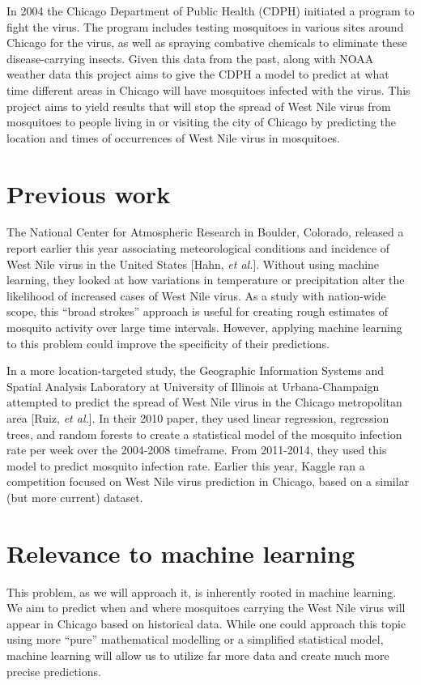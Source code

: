 \documentclass{article} %
\begin{document}
In 2004 the Chicago Department of Public Health (CDPH) initiated a program to fight the virus.  The program includes testing mosquitoes in various sites around Chicago for the virus, as well as spraying combative chemicals to eliminate these disease-carrying insects.  Given this data from the past, along with NOAA weather data this project aims to give the CDPH a model to predict at what time different areas in Chicago will have mosquitoes infected with the virus. This project aims to yield results that will stop the spread of West Nile virus from mosquitoes to people living in or visiting the city of Chicago by predicting the location and times of occurrences of West Nile virus in mosquitoes.

\section{Previous work}
The National Center for Atmospheric Research in Boulder, Colorado, released a report earlier this year associating meteorological conditions and incidence of West Nile virus in the United States [Hahn, \textit{et al.}].  Without using machine learning, they looked at how variations in temperature or precipitation alter the likelihood of increased cases of West Nile virus.    As a study with nation-wide scope, this ``broad strokes'' approach is useful for creating rough estimates of mosquito activity over large time intervals.  However, applying machine learning to this problem could improve the specificity of their predictions.

In a more location-targeted study, the Geographic Information Systems and Spatial Analysis Laboratory at University of Illinois at Urbana-Champaign attempted to predict the spread of West Nile virus in the Chicago metropolitan area [Ruiz, \textit{et al.}].  In their 2010 paper, they used linear regression, regression trees, and random forests to create a statistical model of the mosquito infection rate per week over the 2004-2008 timeframe.  From 2011-2014, they used this model to predict mosquito infection rate.  Earlier this year, Kaggle ran a competition focused on West Nile virus prediction in Chicago, based on a similar (but more current) dataset.  

\section{Relevance to machine learning}
This problem, as we will approach it, is inherently rooted in machine learning.  We aim to predict when and where mosquitoes carrying the West Nile virus will appear in Chicago based on historical data.  While one could approach this topic using more ``pure'' mathematical modelling or a simplified statistical model, machine learning will allow us to utilize far more data and create much more precise predictions.
\end{document}
